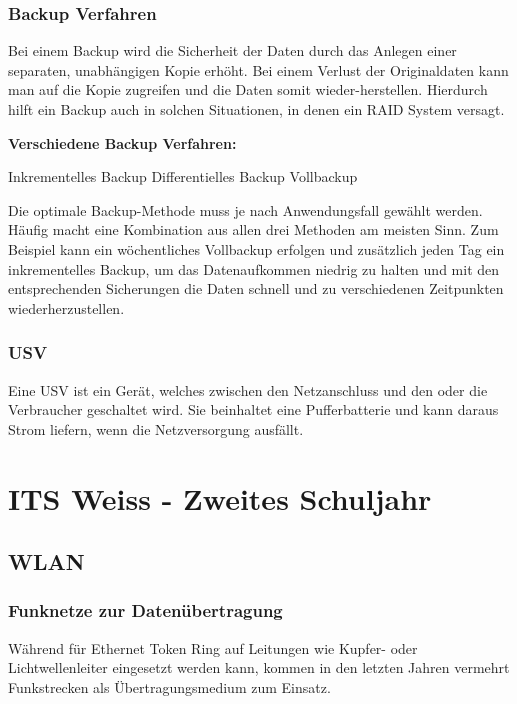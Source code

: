 \documentclass[10pt]{article}
\begin{document}
\begin{flushleft}
\subsubsection{Backup Verfahren}

Bei einem Backup wird die Sicherheit der Daten durch das Anlegen einer separaten, unabhängigen Kopie erhöht. Bei einem Verlust der Originaldaten kann man auf die Kopie zugreifen und die Daten somit wieder-herstellen. Hierdurch hilft ein Backup auch in solchen Situationen, in denen ein RAID System versagt.

\textbf{Verschiedene Backup Verfahren:}
\begin{outline}
    \1 Inkrementelles Backup
    \1 Differentielles Backup
    \1 Vollbackup
\end{outline}

Die optimale Backup-Methode muss je nach Anwendungsfall gewählt werden. Häufig macht eine Kombination aus allen drei Methoden am meisten Sinn. Zum Beispiel kann ein wöchentliches Vollbackup erfolgen und zusätzlich jeden Tag ein inkrementelles Backup, um das Datenaufkommen niedrig zu halten und mit den entsprechenden Sicherungen die Daten schnell und zu verschiedenen Zeitpunkten wiederherzustellen.


\subsubsection{USV}

Eine USV ist ein Gerät, welches zwischen den Netzanschluss und den oder die Verbraucher geschaltet wird. Sie beinhaltet eine Pufferbatterie und kann daraus Strom liefern, wenn die Netzversorgung ausfällt.


\break

\section{ITS Weiss - Zweites Schuljahr}



\subsection{WLAN}
\subsubsection{Funknetze zur Datenübertragung}

Während für Ethernet Token Ring auf Leitungen wie Kupfer- oder Lichtwellenleiter eingesetzt werden kann, kommen in den letzten Jahren vermehrt Funkstrecken als Übertragungsmedium zum Einsatz.


\end{flushleft}
\end{document}
